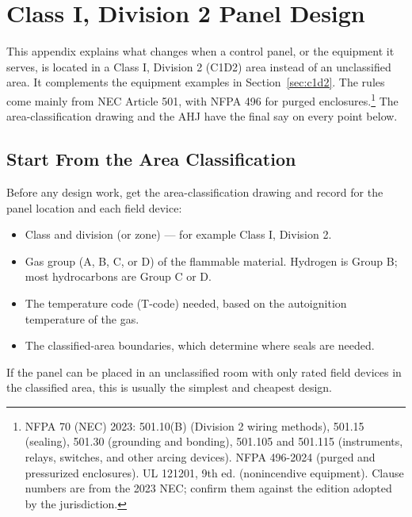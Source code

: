 \chapter{Class I, Division 2 Panel Design}
\label{app:c1d2}
This appendix explains what changes when a control panel, or the equipment it serves, is located in a Class I, Division 2 (C1D2) area instead of an unclassified area. It complements the equipment examples in Section~\ref{sec:c1d2}. The rules come mainly from NEC Article 501, with NFPA 496 for purged enclosures.\footnote{NFPA 70 (NEC) 2023: 501.10(B) (Division 2 wiring methods), 501.15 (sealing), 501.30 (grounding and bonding), 501.105 and 501.115 (instruments, relays, switches, and other arcing devices). NFPA 496-2024 (purged and pressurized enclosures). UL 121201, 9th ed. (nonincendive equipment). Clause numbers are from the 2023 NEC; confirm them against the edition adopted by the jurisdiction.} The area-classification drawing and the AHJ have the final say on every point below.

\section{Start From the Area Classification}
Before any design work, get the area-classification drawing and record for the panel location and each field device:
\begin{itemize}[itemsep=1pt]
  \item Class and division (or zone) --- for example Class I, Division 2.
  \item Gas group (A, B, C, or D) of the flammable material. Hydrogen is Group B; most hydrocarbons are Group C or D.
  \item The temperature code (T-code) needed, based on the autoignition temperature of the gas.
  \item The classified-area boundaries, which determine where seals are needed.
\end{itemize}
If the panel can be placed in an unclassified room with only rated field devices in the classified area, this is usually the simplest and cheapest design.

